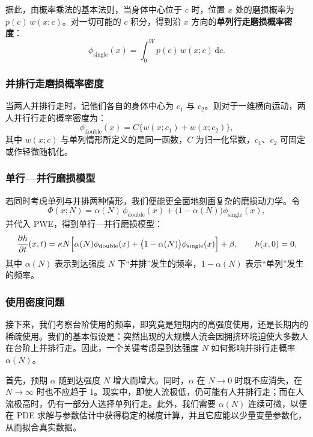 \documentclass[11pt,a4paper,fontset=windows]{ctexart}
\newcommand{\dd}{\mathrm{d}}
\begin{document}
据此，由概率乘法的基本法则，当身体中心位于 $c$ 时，位置 $x$ 处的磨损概率为 $p(c)\,w(x;c)$。对一切可能的 $c$ 积分，得到沿 $x$ 方向的\textbf{单列行走磨损概率密度}：
\begin{equation}
\phi_{\text{single}}(x)=\int_{0}^{W}p(c)\,w(x;c)\,\dd c.
\end{equation}

\subsubsection{并排行走磨损概率密度}

当两人并排行走时，记他们各自的身体中心为 $c_1$ 与 $c_2$。则对于一维横向运动，两人并行行走的概率密度为：
\begin{equation}
\phi_{\text{double}}(x)=C\bigl\{w(x;c_1)+w(x;c_2)\bigr\},
\end{equation}
其中 $w(x;c)$ 与单列情形所定义的是同一函数，$C$ 为归一化常数，$c_1$、$c_2$ 可固定或作轻微随机化。

\subsubsection{单行—并行磨损模型}

若同时考虑单列与并排两种情形，我们便能更全面地刻画复杂的磨损动力学。令
\[
\Phi(x;N)=\alpha(N)\,\phi_{\text{double}}(x)+\bigl(1-\alpha(N)\bigr)\phi_{\text{single}}(x),
\]
并代入 PWE，得到单行—并行磨损模型：
\begin{equation}
\frac{\partial h}{\partial t}(x,t)=\kappa N\Bigl[\alpha(N)\phi_{\text{double}}(x)+\bigl(1-\alpha(N)\bigr)\phi_{\text{single}}(x)\Bigr]+\beta,
\qquad h(x,0)=0,
\end{equation}
其中 $\alpha(N)$ 表示到达强度 $N$ 下“并排”发生的频率，$1-\alpha(N)$ 表示“单列”发生的频率。

\subsubsection{使用密度问题}

接下来，我们考察台阶使用的频率，即究竟是短期内的高强度使用，还是长期内的稀疏使用。我们的基本假设是：突然出现的大规模人流会因拥挤环境迫使大多数人在台阶上并排行走。因此，一个关键考虑是到达强度 $N$ 如何影响并排行走概率 $\alpha(N)$。

首先，预期 $\alpha$ 随到达强度 $N$ 增大而增大。同时，$\alpha$ 在 $N\to0$ 时既不应消失，在 $N\to\infty$ 时也不应趋于 1。现实中，即使人流极低，仍可能有人并排行走；而在人流极高时，仍有一部分人选择单列行走。此外，我们需要 $\alpha(N)$ 连续可微，以便在 PDE 求解与参数估计中获得稳定的梯度计算，并且它应能以少量变量参数化，从而拟合真实数据。
\end{document}
